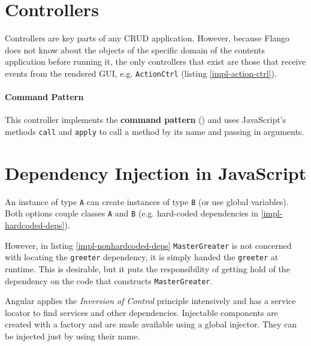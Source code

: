 \section{Controllers}
Controllers are key parts of any \ac{CRUD} application.
However, because Flango \cm does not know about the objects of the specific domain  of the contents application before running it, the only controllers that exist are those that receive events from the rendered \ac{GUI}, e.g. \texttt{ActionCtrl} (listing \ref{impl-action-ctrl}).
\paragraph{Command Pattern} This controller implements the \textbf{command pattern} (\cite{Osmani:2012}) and uses JavaScript's methods \texttt{call} and \texttt{apply} to call a method by its name and passing in arguments.




\section{Dependency Injection in JavaScript}
An instance of type \texttt{A} can create instances of type \texttt{B} (or use global variables). 
Both options couple classes \texttt{A} and \texttt{B} (e.g. hard-coded dependencies in \ref{impl-hardcoded-deps}).





However, in listing \ref{impl-nonhardcoded-deps} \texttt{MasterGreater} is not concerned with locating the \texttt{greeter} dependency, it is simply handed the \texttt{greeter} at runtime.
This is desirable, but it puts the responsibility of getting hold of the dependency on the code that constructs \texttt{MasterGreater}.

Angular applies the \emph{Inversion of Control} principle intensively and has a service locator to find services and other dependencies.
Injectable components are created with a factory and are made available using a global injector.
They can be injected just by using their name.

